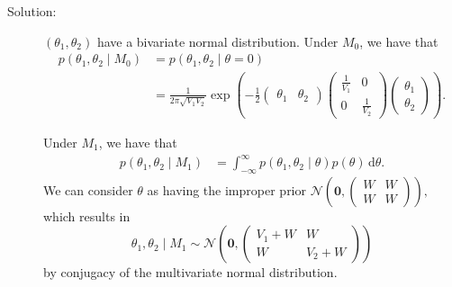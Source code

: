 \documentclass[letterpaper,11pt]{article}
\begin{document}
\begin{enumerate}
\begin{enumerate}
    \begin{description}
    \item[Solution:] $\left(\theta_1,\theta_2\right)$ have a bivariate normal
      distribution. Under $M_0$, we have that
      \begin{align}
        p\left(\theta_1,\theta_2 \mid M_0\right)
        &= p\left(\theta_1,\theta_2 \mid \theta = 0\right) \nonumber\\
        &= \frac{1}{2\pi\sqrt{V_1V_2}}\exp\left(
          -\frac{1}{2}
          \begin{pmatrix}
            \theta_1 & \theta_2
          \end{pmatrix}
                       \begin{pmatrix}
                         \frac{1}{V_1} & 0 \\
                         0 & \frac{1}{V_2}
                       \end{pmatrix}
                       \begin{pmatrix}
                         \theta_1 \\ \theta_2
                       \end{pmatrix}
          \right).
      \end{align}
      
      Under $M_1$, we have that
      \begin{align}
        p\left(\theta_1,\theta_2 \mid M_1\right)
        &= \int_{-\infty}^\infty p\left(\theta_1,\theta_2 \mid \theta\right)
          p\left(\theta\right)\,\mathrm{d}\theta.
      \end{align}
      We can consider $\theta$ as having the improper prior
      $\mathcal{N}\left(\mathbf{0}, \begin{pmatrix} W & W \\ W &
          W \end{pmatrix}\right),$ which results in
      \begin{equation}
        \theta_1,\theta_2 \mid M_1 \sim \mathcal{N}\left(
          \mathbf{0}, \begin{pmatrix}
            V_1 + W & W \\
            W & V_2 + W
          \end{pmatrix}          
        \right)
      \end{equation}
      by conjugacy of the multivariate normal distribution.


\end{description}
\end{enumerate}
\end{enumerate}
\end{document}
